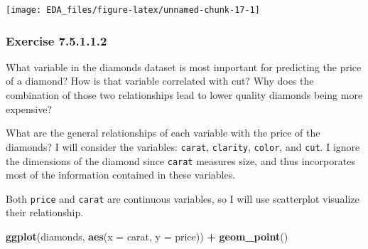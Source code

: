 \documentclass[]{book}
\newenvironment{Shaded}{\begin{snugshade}}{\end{snugshade}}
\newcommand{\DataTypeTok}[1]{\textcolor[rgb]{0.13,0.29,0.53}{#1}}
\newcommand{\DecValTok}[1]{\textcolor[rgb]{0.00,0.00,0.81}{#1}}
\newcommand{\KeywordTok}[1]{\textcolor[rgb]{0.13,0.29,0.53}{\textbf{#1}}}
\newcommand{\NormalTok}[1]{#1}
\newcommand{\OperatorTok}[1]{\textcolor[rgb]{0.81,0.36,0.00}{\textbf{#1}}}
\newcommand{\StringTok}[1]{\textcolor[rgb]{0.31,0.60,0.02}{#1}}
\theoremstyle{plain}
\theoremstyle{remark}
\begin{document}
\begin{Shaded}
\end{Shaded}

\begin{center}\texttt{[image: EDA\_files/figure-latex/unnamed-chunk-17-1]} \end{center}

\hypertarget{exercise-7.5.1.1.2}{%
\subsubsection*{\texorpdfstring{Exercise
{7.5.1.1.2}}{Exercise 7.5.1.1.2}}\label{exercise-7.5.1.1.2}}

What variable in the diamonds dataset is most important for predicting
the price of a diamond? How is that variable correlated with cut? Why
does the combination of those two relationships lead to lower quality
diamonds being more expensive?

What are the general relationships of each variable with the price of
the diamonds? I will consider the variables: \texttt{carat},
\texttt{clarity}, \texttt{color}, and \texttt{cut}. I ignore the
dimensions of the diamond since \texttt{carat} measures size, and thus
incorporates most of the information contained in these variables.

Both \texttt{price} and \texttt{carat} are continuous variables, so I
will use scatterplot visualize their relationship.

\begin{Shaded}
\begin{Highlighting}[]
\KeywordTok{ggplot}\NormalTok{(diamonds, }\KeywordTok{aes}\NormalTok{(}\DataTypeTok{x =}\NormalTok{ carat, }\DataTypeTok{y =}\NormalTok{ price)) }\OperatorTok{+}
\StringTok{  }\KeywordTok{geom_point}\NormalTok{()}
\end{Highlighting}
\end{Shaded}
\end{document}
